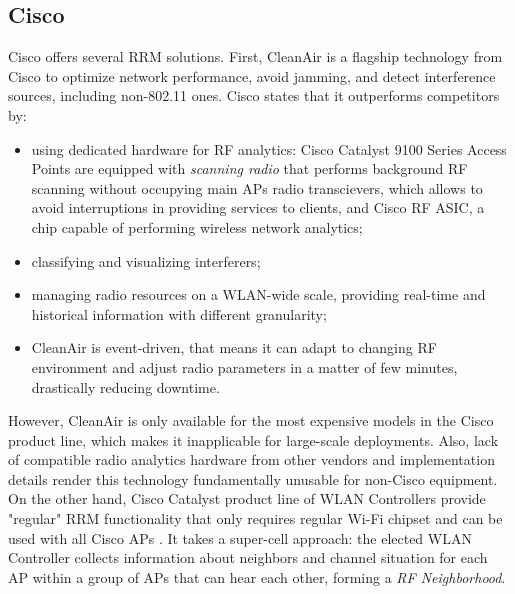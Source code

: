 \subsection{Cisco}
Cisco offers several RRM solutions.
First, CleanAir is a flagship technology from Cisco \cite{CiscoCleanAirTechnology2014} to optimize network performance, avoid jamming, and detect interference sources, including non-802.11 ones. Cisco states that it outperforms competitors by:
\begin{itemize}
    \item using dedicated hardware for RF analytics: Cisco Catalyst 9100 Series Access Points are equipped with \textit{scanning radio} that performs background RF scanning without occupying main APs radio transcievers, which allows to avoid interruptions in providing services to clients, and Cisco RF ASIC, a chip capable of performing wireless network analytics;
    \item classifying and visualizing interferers;
    \item managing radio resources on a WLAN-wide scale, providing real-time and historical information with different granularity;
    \item CleanAir is event-driven, that means it can adapt to changing RF environment and adjust radio parameters in a matter of few minutes, drastically reducing downtime.
\end{itemize}
However, CleanAir is only available for the most expensive models in the Cisco product line, which makes it inapplicable for large-scale deployments. Also, lack of compatible radio analytics hardware from other vendors and implementation details render this technology fundamentally unusable for non-Cisco equipment.
On the other hand, Cisco Catalyst product line of WLAN Controllers provide "regular" RRM functionality that only requires regular Wi-Fi chipset and can be used with all Cisco APs \cite{ciscoRadioResourceManagement}. It takes a super-cell approach: the elected WLAN Controller collects information about neighbors and channel situation for each AP within a group of APs that can hear each other, forming a \textit{RF Neighborhood}\cite{arenaUnderstandingTroubleshootingCisco2022}.

